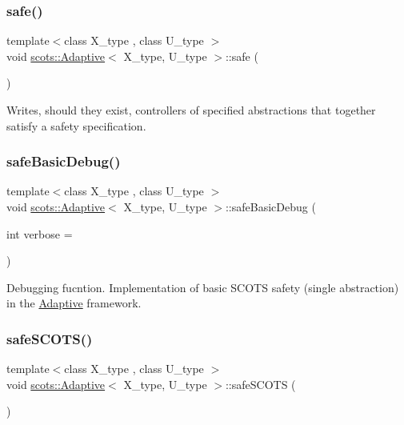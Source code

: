 \subsubsection{\texorpdfstring{safe()}{safe()}}
{\footnotesize\ttfamily template$<$class X\+\_\+type , class U\+\_\+type $>$ \\
void \hyperlink{classscots_1_1Adaptive}{scots\+::\+Adaptive}$<$ X\+\_\+type, U\+\_\+type $>$\+::safe (\begin{DoxyParamCaption}{ }\end{DoxyParamCaption})\hspace{0.3cm}{\ttfamily [inline]}}

Writes, should they exist, controllers of specified abstractions that together satisfy a safety specification. \mbox{\label{classscots_1_1Adaptive_a1c7b5c07621e61b846b70e949b92b0b7}} 
\subsubsection{\texorpdfstring{safe\+Basic\+Debug()}{safeBasicDebug()}}
{\footnotesize\ttfamily template$<$class X\+\_\+type , class U\+\_\+type $>$ \\
void \hyperlink{classscots_1_1Adaptive}{scots\+::\+Adaptive}$<$ X\+\_\+type, U\+\_\+type $>$\+::safe\+Basic\+Debug (\begin{DoxyParamCaption}\item[{int}]{verbose = {} }\end{DoxyParamCaption})\hspace{0.3cm}{\ttfamily [inline]}}

Debugging fucntion. Implementation of basic S\+C\+O\+TS safety (single abstraction) in the \hyperlink{classscots_1_1Adaptive}{Adaptive} framework. \mbox{\label{classscots_1_1Adaptive_afd80e725160ae143493105b2fe99fe02}} 
\subsubsection{\texorpdfstring{safe\+S\+C\+O\+T\+S()}{safeSCOTS()}}
{\footnotesize\ttfamily template$<$class X\+\_\+type , class U\+\_\+type $>$ \\
void \hyperlink{classscots_1_1Adaptive}{scots\+::\+Adaptive}$<$ X\+\_\+type, U\+\_\+type $>$\+::safe\+S\+C\+O\+TS (\begin{DoxyParamCaption}{ }\end{DoxyParamCaption})\hspace{0.3cm}{\ttfamily [inline]}}

